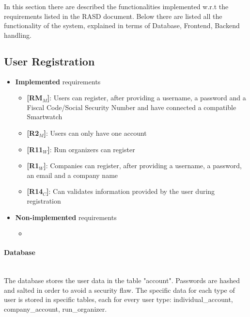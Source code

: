 In this section there are described the functionalities implemented w.r.t the requirements listed in the RASD document.
Below there are listed all the functionality of the system, explained in terms of Database, Frontend, Backend handling.



\subsection{User Registration}
\begin{itemize}
\item \textbf{Implemented} requirements
        \begin{itemize}
   \item \textbf{[RM$_M$]}: Users can register, after providing a username, a password and a Fiscal Code/Social Security Number and have connected a compatible Smartwatch
    \item \textbf{[R2$_M$]}: Users can only have one account 
    
  \item \textbf{[R11$_W$]}: Run organizers can register
    
    \item \textbf{[R1$_W$]}: Companies can register, after providing a username, a password, an email and a company name

    \item \textbf{[R14$_C$]}: Can validates information provided by the user during registration

        \end{itemize}
    \item \textbf{Non-implemented} requirements
    \begin{itemize}
            \item 
        \end{itemize}
\end{itemize}

\paragraph{Database} \mbox{}\\ 
The database stores the user data in the table "account".
Passwords are hashed and salted in order to avoid a security flaw.
The specific data for each type of user is stored in specific tables, each for every user type: individual\_account, company\_account, run\_organizer.

